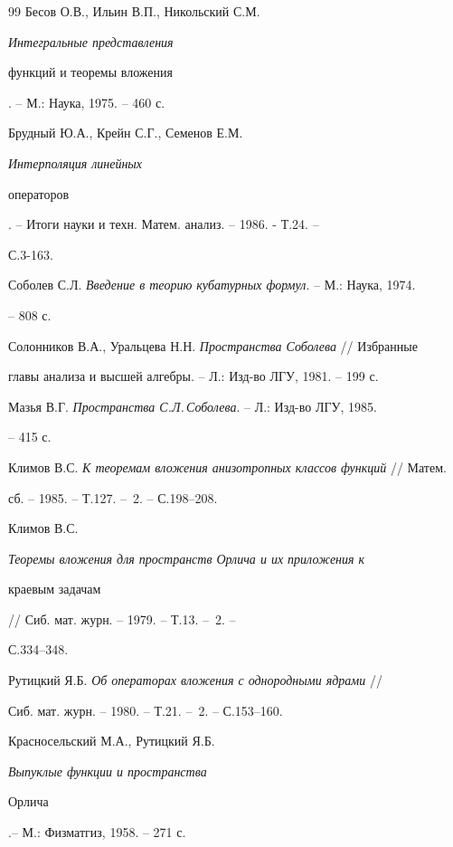 \begin{thebibliography}{99}
Бесов О.В., Ильин В.П., Никольский С.М. {\em Интегральные представления 


функций и теоремы вложения}. -- М.: Наука, 1975. -- 460 с. 


 




Брудный Ю.А., Крейн С.Г., Семенов Е.М. {\em Интерполяция линейных 


операторов}. -- Итоги науки и техн. Матем. анализ. -- 1986. - Т.24. -- 


С.3-163. 


 




Соболев С.Л. {\em Введение в теорию кубатурных формул}. -- М.: Наука, 1974. 


-- 808 с. 


 




Солонников В.А., Уральцева Н.Н. {\em Пространства Соболева} // Избранные 


главы анализа и высшей алгебры. -- Л.: Изд-во ЛГУ, 1981. -- 199 с. 


 




Мазья В.Г. {\em Пространства С.Л.\,Соболева}. -- Л.: Изд-во ЛГУ, 1985. 


-- 415 с. 


 




Климов В.С. {\em К теоремам вложения анизотропных классов функций} // Матем. 


сб. -- 1985. -- Т.127. -- \No\,2. -- С.198--208. 


 




Климов В.С. {\em Теоремы вложения для пространств Орлича и их приложения к 


краевым задачам} // Сиб. мат. журн. -- 1979. -- Т.13. -- \No\,2. -- 


С.334--348. 


 




Рутицкий Я.Б. {\em Об операторах вложения с однородными ядрами} // 


Сиб. мат. журн. -- 1980. -- Т.21. -- \No\,2. -- С.153--160. 


 




Красносельский М.А., Рутицкий Я.Б. {\em Выпуклые функции и пространства 


Орлича}.-- М.: Физматгиз, 1958. -- 271 с. 


 


 


\end{thebibliography} 


